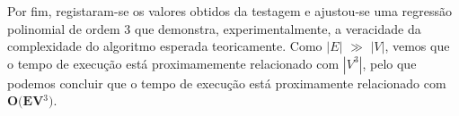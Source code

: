 \documentclass[12pt]{article}
\begin{document}
Por fim, registaram-se os valores obtidos da testagem e ajustou-se uma regressão polinomial de ordem 3 que demonstra, experimentalmente, a veracidade da complexidade do algoritmo esperada teoricamente. Como $\left|E\right|$ $\gg$ $\left|V\right|$, vemos que o tempo de execução está proximamemente relacionado com $\left|V^3\right|$, pelo que podemos concluir que o tempo de execução está proximamente relacionado com  $\textbf{O(EV$^3$)}$.
\end{document}

